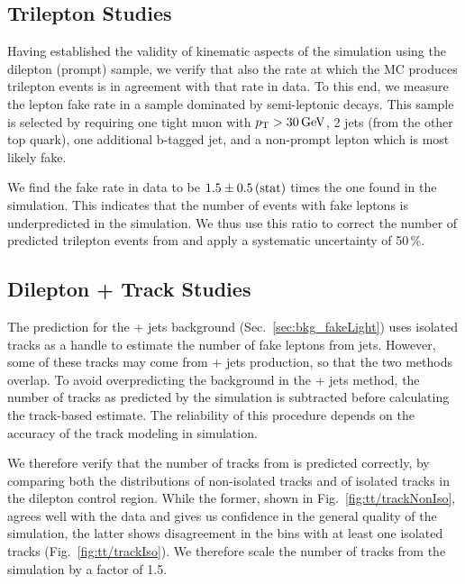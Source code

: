 \subsection{Trilepton Studies}
\label{sec:bkg_tt/trilepton}

Having established the validity of kinematic aspects of the \ttbar simulation using the dilepton (prompt) sample, we verify that also the rate at which the \ttbar MC produces trilepton events is in agreement with that rate in data. To this end, we measure the lepton fake rate in a sample dominated by semi-leptonic \ttbar decays. This sample is selected by requiring one tight muon with $p_{\mathrm{T}} > 30\,\text{Ge\hspace{-.08em}V}$, 2 jets (from the other top quark), one additional b-tagged jet, and a non-prompt lepton which is most likely fake.

We find the \ttbar fake rate in data to be $1.5 \pm 0.5\,\text{(stat)}$ times the one found in the \ttbar simulation. This indicates that the number of events with fake leptons is underpredicted in the \ttbar simulation. We thus use this ratio to correct the number of predicted trilepton events from \ttbar and apply a systematic uncertainty of 50\,\%.

\subsection{Dilepton + Track Studies}
\label{sec:bkg_tt/dilepton+track}

The prediction for the \Z + jets background (Sec.~\ref{sec:bkg_fakeLight}) uses isolated tracks as a handle to estimate the number of fake leptons from jets. However, some of these tracks may come from \ttbar + jets production, so that the two methods overlap. To avoid overpredicting the background in the \Z + jets method, the number of tracks as predicted by the \ttbar simulation is subtracted before calculating the track-based estimate. The reliability of this procedure depends on the accuracy of the track modeling in simulation.

We therefore verify that the number of tracks from \ttbar is predicted correctly, by comparing both the distributions of non-isolated tracks and of isolated tracks in the dilepton control region. While the former, shown in Fig.~\ref{fig:tt/trackNonIso}, agrees well with the data and gives us confidence in the general quality of the simulation, the latter shows disagreement in the bins with at least one isolated tracks (Fig.~\ref{fig:tt/trackIso}). We therefore scale the number of tracks from the \ttbar simulation by a factor of 1.5.

